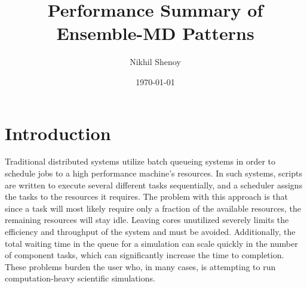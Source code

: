 \documentclass[]{article}
\begin{document}
\title{Performance Summary of Ensemble-MD Patterns}
\author{Nikhil Shenoy}
\date{\today}
\maketitle


\section{Introduction}

	Traditional distributed systems utilize batch queueing systems in order to schedule jobs to a high performance machine's resources. In such systems, scripts are written to execute several different tasks sequentially, and a scheduler assigns the tasks to the resources it requires. The problem with this approach is that since a task will most likely require only a fraction of the available resources, the remaining resources will stay idle. Leaving cores unutilized severely limits the efficiency and throughput of the system and must be avoided. Additionally, the total waiting time in the queue for a simulation can scale quickly in the number of component tasks, which can significantly increase the time to completion. These problems burden the user who, in many cases, is attempting to run computation-heavy scientific simulations.
\end{document}
